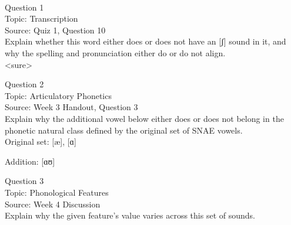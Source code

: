 \documentclass[12pt]{article}
\begin{document}
\newpage

\begin{center}
\textbf{{\color{red}{\HUGE END OF EXAM}}}\\

\end{center}
\newpage

\begin{center}
\textbf{{\color{blue}{\HUGE START OF EXAM\\}}}

\textbf{{\color{blue}{\HUGE Student ID: 67125\\}}}

\textbf{{\color{blue}{\HUGE \\}}}

\end{center}
\newpage

{\large Question 1}\\

Topic: Transcription\\
Source: Quiz 1, Question 10\\

Explain whether this word either does or does not have an [ʃ] sound in it, and why the spelling and pronunciation either do or do not align.\\

<sure>


\newpage

{\large Question 2}\\

Topic: Articulatory Phonetics\\
Source: Week 3 Handout, Question 3\\

Explain why the additional vowel below either does or does not belong in the phonetic natural class defined by the original set of SNAE vowels.\\

Original set: {[æ]}, {[ɑ]}

Addition: {[ɑʊ]}


\newpage

{\large Question 3}\\

Topic: Phonological Features\\
Source: Week 4 Discussion\\

Explain why the given feature's value varies across this set of sounds.\\
\end{document}
